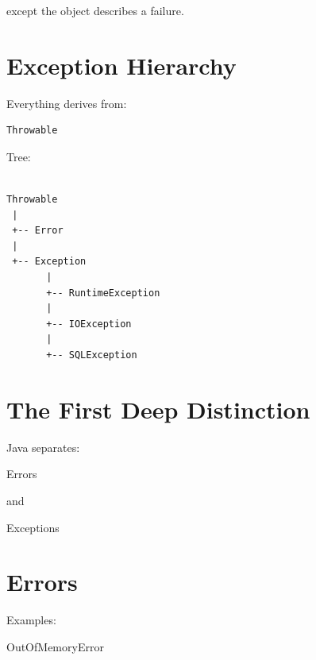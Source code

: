\documentclass[11pt,a4paper]{book}
\begin{document}
except the object describes
a failure.


\section{Exception Hierarchy}

Everything derives from:

\begin{verbatim} 
Throwable
\end{verbatim}


Tree:

\begin{verbatim}

Throwable
 |
 +-- Error
 |
 +-- Exception
       |
       +-- RuntimeException
       |
       +-- IOException
       |
       +-- SQLException

\end{verbatim}


\section{The First Deep Distinction}

Java separates:


Errors


and


Exceptions


\section{Errors}

Examples:


OutOfMemoryError

\end{document}
